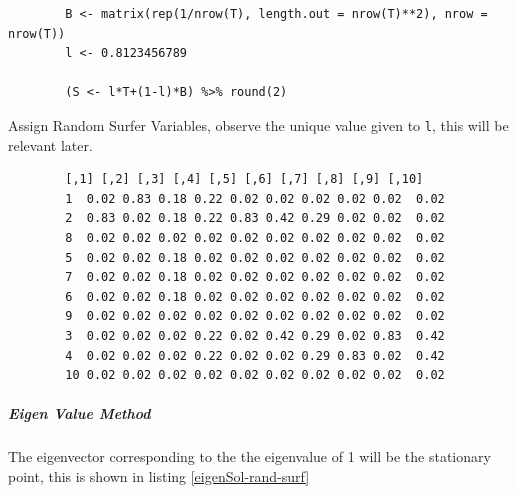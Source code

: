 \documentclass[11pt]{report}
\begin{document}
\begin{listing}[htbp]
    \begin{tcolorbox}
        \begin{verbatim}
        B <- matrix(rep(1/nrow(T), length.out = nrow(T)**2), nrow = nrow(T))
        l <- 0.8123456789

        (S <- l*T+(1-l)*B) %>% round(2)
        \end{verbatim}
        \caption{\label{r-var-random-surfer}Assign Random Surfer Variables, observe the unique value given to \texttt{l}, this will be relevant later.}
    \tcblower
        \begin{verbatim}
        [,1] [,2] [,3] [,4] [,5] [,6] [,7] [,8] [,9] [,10]
        1  0.02 0.83 0.18 0.22 0.02 0.02 0.02 0.02 0.02  0.02
        2  0.83 0.02 0.18 0.22 0.83 0.42 0.29 0.02 0.02  0.02
        8  0.02 0.02 0.02 0.02 0.02 0.02 0.02 0.02 0.02  0.02
        5  0.02 0.02 0.18 0.02 0.02 0.02 0.02 0.02 0.02  0.02
        7  0.02 0.02 0.18 0.02 0.02 0.02 0.02 0.02 0.02  0.02
        6  0.02 0.02 0.18 0.02 0.02 0.02 0.02 0.02 0.02  0.02
        9  0.02 0.02 0.02 0.02 0.02 0.02 0.02 0.02 0.02  0.02
        3  0.02 0.02 0.02 0.22 0.02 0.42 0.29 0.02 0.83  0.42
        4  0.02 0.02 0.02 0.22 0.02 0.02 0.29 0.83 0.02  0.42
        10 0.02 0.02 0.02 0.02 0.02 0.02 0.02 0.02 0.02  0.02
        \end{verbatim}
    \end{tcolorbox}
\end{listing}

\subparagraph{Eigen Value Method}
\label{eigen-value-method}
The eigenvector corresponding to the the eigenvalue of 1 will be the
stationary point, this is shown in listing \ref{eigenSol-rand-surf}
\end{document}
